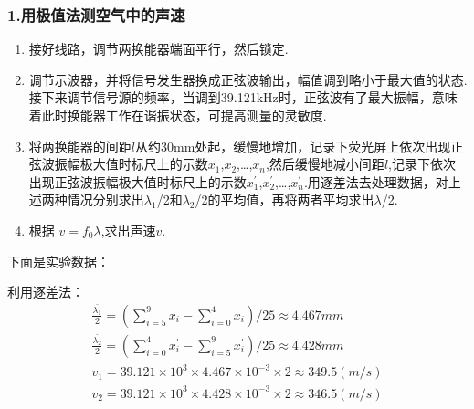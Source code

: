 \documentclass[12pt,a4paper,UTF8]{ctexart}
\begin{document}
	\subsubsection*{1.用极值法测空气中的声速}
		\begin{enumerate}[(1)]
			\item 接好线路，调节两换能器端面平行，然后锁定.
			\item 调节示波器，并将信号发生器换成正弦波输出，幅值调到略小于最大值的状态.接下来调节信号源的频率，当调到39.121kHz时，正弦波有了最大振幅，意味着此时换能器工作在谐振状态，可提高测量的灵敏度.
			\item 将两换能器的间距$l$从约30mm处起，缓慢地增加，记录下荧光屏上依次出现正弦波振幅极大值时标尺上的示数$x_1$,$x_2$,\dots,$x_n$,然后缓慢地减小间距$l$,记录下依次出现正弦波振幅极大值时标尺上的示数$x_1^{\prime}$,$x_2^{\prime}$,\dots,$x_n^{\prime}$.用逐差法去处理数据，对上述两种情况分别求出$\lambda_1$/2和$\lambda_2$/2的平均值，再将两者平均求出$\lambda$/2.
			\item 根据 $ v=f_0\lambda $,求出声速$v$.
		\end{enumerate}
\newpage
		下面是实验数据：
		\begin{table}[htbp]
		\centering
		\caption{极值法测空气中声速数据表}
		\end{table}
		
		利用逐差法：
		\begin{gather*}
		\frac{\bar{\lambda_1}}{2} = (\sum_{i=5}^{9} x_i -\sum_{i=0}^{4} x_i)/25 \approx 4.467mm \\
		\frac{\bar{\lambda_2}}{2} = (\sum_{i=0}^{4} x_i^{\prime} -\sum_{i=5}^{9} x_i^{\prime})/25 \approx 4.428mm \\
		v_1=39.121 \times 10^{3} \times 4.467 \times 10^{-3} \times 2 \approx 349.5(m/s) \\
		v_2=39.121 \times 10^{3} \times 4.428 \times 10^{-3} \times 2 \approx 346.5(m/s)
		\end{gather*}
\end{document}
